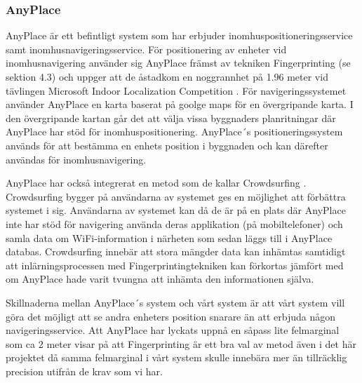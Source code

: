 \documentclass[swedish, a4paper,12pt]{article}
\begin{document}
\subsubsection{AnyPlace}
AnyPlace är ett befintligt system som har erbjuder inomhuspositioneringsservice samt inomhusnavigeringsservice. För positionering av enheter vid inomhusnavigering använder sig AnyPlace främst av tekniken Fingerprinting (se sektion 4.3) och uppger att de åstadkom en noggrannhet på 1.96 meter vid tävlingen Microsoft Indoor Localization Competition \cite{anyplace}
\cite{IPS_tavling}.
För navigeringssystemet använder AnyPlace en karta baserat på goolge maps för en övergripande karta. I den övergripande kartan går det att välja vissa byggnaders planritningar där AnyPlace har stöd för inomhuspositionering. AnyPlace´s positioneringssystem används för att bestämma en enhets position i byggnaden och kan därefter användas för inomhusnavigering.

AnyPlace har också integrerat en metod som de kallar Crowdsurfing \cite{anyplace}. Crowdsurfing bygger på användarna av systemet ges en möjlighet att förbättra systemet i sig. Användarna av systemet kan då de är på en plats där AnyPlace inte har stöd för navigering använda deras applikation (på mobiltelefoner) och samla data om WiFi-information i närheten som sedan läggs till i AnyPlace databas. Crowdsurfing innebär att stora mängder data kan inhämtas samtidigt att inlärningsprocessen med Fingerprintingtekniken kan förkortas jämfört med om AnyPlace hade varit tvungna att inhämta den informationen själva.

Skillnaderna mellan AnyPlace´s system och vårt system är att vårt system vill göra det möjligt att se andra enheters position snarare än att erbjuda någon navigeringsservice. Att AnyPlace har lyckats uppnå en såpass lite felmarginal som ca 2 meter visar på att Fingerprinting är ett bra val av metod även i det här projektet då samma felmarginal i vårt system skulle innebära mer än tillräcklig precision utifrån de krav som vi har.

\end{document}

